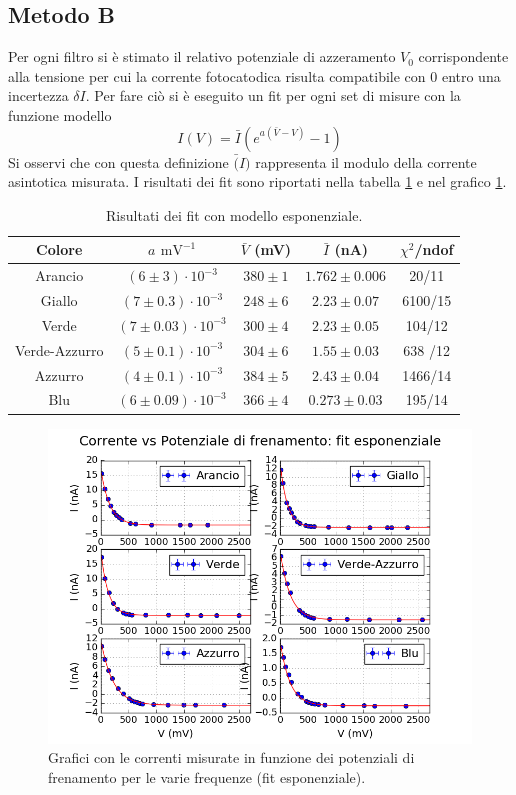 \documentclass[10pt,a4paper]{article}
\begin{document}
\subsection{Metodo B}
Per ogni filtro si è stimato il relativo potenziale di azzeramento $V_0$ corrispondente alla tensione per cui la corrente fotocatodica risulta compatibile con 0 entro una incertezza $\delta I$. Per fare ciò si è eseguito un fit per ogni set di misure con la funzione modello
\begin{equation}\label{eq:fitexp}
I(V)=\bar{I}(e^{a(\bar{V}-V)}-1)
\end{equation}
Si osservi che con questa definizione $\bar(I)$ rappresenta il modulo della  corrente asintotica misurata.
I risultati dei fit sono riportati nella tabella \ref{tab:fitexp} e nel grafico \ref{fig:fitexp}.
\begin{table}[!htb]
\centering
\begin{tabular}{|c|c|c|c|c|}
\hline
Colore & $a$ $\mbox{mV}^{-1}$ &$\bar{V}$ (mV) & $\bar{I}$ (nA) & $\chi^2$/ndof\\
\hline
Arancio & $(6\pm 3)\cdot 10 ^{-3}$ & $380 \pm 1$ & $1.762\pm 0.006$ & 20/11\\
\hline
Giallo & $(7\pm 0.3) \cdot 10^{-3}$ & $248\pm 6$ & $2.23 \pm 0.07$ & 6100/15\\
\hline 
Verde & $(7 \pm 0.03)\cdot 10 ^ {-3}$ & $300 \pm 4$ & $2.23 \pm 0.05$ & 104/12 \\
\hline
Verde-Azzurro & $(5\pm 0.1)\cdot 10^{-3}$ & $304\pm 6$ & $1.55 \pm 0.03$ & 638 /12\\
\hline 
Azzurro & $(4 \pm 0.1)\cdot 10^{-3}$ & $384\pm 5$ & $2.43 \pm0.04$ & 1466/14\\
\hline
Blu & $(6\pm 0.09)\cdot 10^{-3} $ & $366\pm4$  &$0.273 \pm0.03$ & 195/14\\
\hline

\end{tabular}
\caption{Risultati dei fit con modello esponenziale.\label{tab:fitexp}}
\end{table}
\begin{figure}[!ht]
\centering
\includegraphics[scale=1]{fitesponenziale.png}
\caption{Grafici con le correnti misurate in funzione dei potenziali di frenamento per le varie frequenze (fit esponenziale).\label{fig:fitexp}}
\end{figure}
\end{document}
